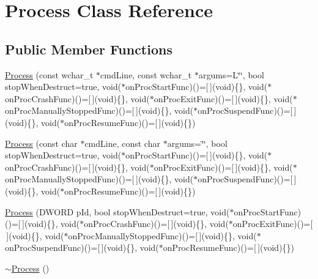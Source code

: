 \hypertarget{class_process}{\section{Process Class Reference}
\label{class_process}
}
\subsection*{Public Member Functions}
\begin{DoxyCompactItemize}
\item 
\hyperlink{class_process_aafec3f30878e8e4cdc7a117784f54902}{Process} (const wchar\+\_\+t $\ast$cmd\+Line, const wchar\+\_\+t $\ast$argums=L\char`\"{}\char`\"{}, bool stop\+When\+Destruct=true, void($\ast$on\+Proc\+Start\+Func)()=\mbox{[}$\,$\mbox{]}(void)\{\}, void($\ast$on\+Proc\+Crash\+Func)()=\mbox{[}$\,$\mbox{]}(void)\{\}, void($\ast$on\+Proc\+Exit\+Func)()=\mbox{[}$\,$\mbox{]}(void)\{\}, void($\ast$on\+Proc\+Manually\+Stopped\+Func)()=\mbox{[}$\,$\mbox{]}(void)\{\}, void($\ast$on\+Proc\+Suspend\+Func)()=\mbox{[}$\,$\mbox{]}(void)\{\}, void($\ast$on\+Proc\+Resume\+Func)()=\mbox{[}$\,$\mbox{]}(void)\{\})
\item 
\hyperlink{class_process_a681a8862012fa707d3d8b0ec299d06e9}{Process} (const char $\ast$cmd\+Line, const char $\ast$argums=\char`\"{}\char`\"{}, bool stop\+When\+Destruct=true, void($\ast$on\+Proc\+Start\+Func)()=\mbox{[}$\,$\mbox{]}(void)\{\}, void($\ast$on\+Proc\+Crash\+Func)()=\mbox{[}$\,$\mbox{]}(void)\{\}, void($\ast$on\+Proc\+Exit\+Func)()=\mbox{[}$\,$\mbox{]}(void)\{\}, void($\ast$on\+Proc\+Manually\+Stopped\+Func)()=\mbox{[}$\,$\mbox{]}(void)\{\}, void($\ast$on\+Proc\+Suspend\+Func)()=\mbox{[}$\,$\mbox{]}(void)\{\}, void($\ast$on\+Proc\+Resume\+Func)()=\mbox{[}$\,$\mbox{]}(void)\{\})
\item 
\hyperlink{class_process_a263e8ac92a74e4e962748c3c68b2fc22}{Process} (D\+W\+O\+R\+D p\+Id, bool stop\+When\+Destruct=true, void($\ast$on\+Proc\+Start\+Func)()=\mbox{[}$\,$\mbox{]}(void)\{\}, void($\ast$on\+Proc\+Crash\+Func)()=\mbox{[}$\,$\mbox{]}(void)\{\}, void($\ast$on\+Proc\+Exit\+Func)()=\mbox{[}$\,$\mbox{]}(void)\{\}, void($\ast$on\+Proc\+Manually\+Stopped\+Func)()=\mbox{[}$\,$\mbox{]}(void)\{\}, void($\ast$on\+Proc\+Suspend\+Func)()=\mbox{[}$\,$\mbox{]}(void)\{\}, void($\ast$on\+Proc\+Resume\+Func)()=\mbox{[}$\,$\mbox{]}(void)\{\})
\item 
\hyperlink{class_process_a990776d181dbbde7ff8ac12713d814b3}{$\sim$\+Process} ()
\item 

\end{DoxyCompactItemize}
